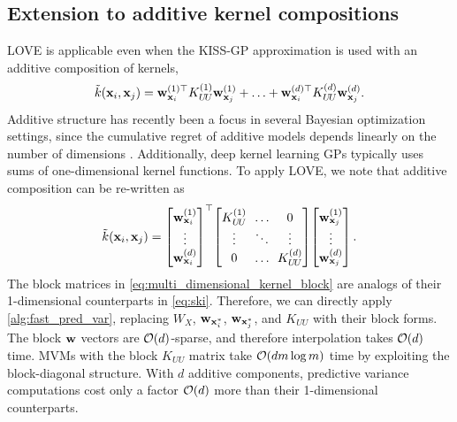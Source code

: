 \subsection{Extension to additive kernel compositions}
LOVE{} is applicable even when the KISS-GP approximation is used with an additive composition of kernels,
%
\begin{equation}
  \tilde{k}(\mathbf{x}_i, \mathbf{x}_j) =
  \mathbf{w}^{(1)\top}_{\mathbf{x}_i} K^{(1)}_{U \! U} \mathbf{w}^{(1)}_{\mathbf{x}_j} + \ldots + \mathbf{w}^{(d)\top}_{\mathbf{x}_i} K^{(d)}_{U \! U} \mathbf{w}^{(d)}_{\mathbf{x}_j}.
  \notag
\end{equation}
Additive structure has recently been a focus in several Bayesian optimization settings, since the cumulative regret of additive models depends linearly on the number of dimensions
\cite{kandasamy2015high,wang2017batched,gardner2017discovering,wang2017max}.
Additionally, deep kernel learning GPs \citep{wilson2016stochastic,wilson2016deep} typically uses sums of one-dimensional kernel functions.
To apply LOVE{}, we note that additive composition can be re-written as
%
\begin{equation}
  \tilde{k}(\bx_i, \bx_j) =
  \begin{bmatrix}
    \bw^{(1)}_{\bx_i} \\
    \vdots \\
    \bw^{(d)}_{\bx_i}
  \end{bmatrix}^\top
  \!
  \begin{bmatrix}
    K^{(1)}_{U \! U} & \!\! \ldots \!\! & 0 \\
    \vdots & \!\! \ddots \!\! & \vdots \\
    0 & \!\! \ldots \!\! & K^{(d)}_{U \! U}
  \end{bmatrix}
  \!
  \begin{bmatrix}
    \bw^{(1)}_{\bx_j} \\
    \vdots \\
    \bw^{(d)}_{\bx_j}
  \end{bmatrix}.
  \label{eq:multi_dimensional_kernel_block}
\end{equation}
%
The block matrices in \eqref{eq:multi_dimensional_kernel_block} are analogs of their 1-dimensional counterparts in \eqref{eq:ski}.
Therefore, we can directly apply \autoref{alg:fast_pred_var}, replacing $W_X$, $\mathbf{w}_{\mathbf{x}^*_i}$, $\mathbf{w}_{\mathbf{x}^*_j}$, and $K_{UU}$ with their block forms.
The block $\mathbf{w}$ vectors are $\bigo{d}$-sparse, and therefore interpolation takes $\bigo{d}$ time.
MVMs with the block $K_{UU}$ matrix take $\bigo{dm\log m}$ time by exploiting the block-diagonal structure. With $d$ additive components, predictive variance computations cost only a factor $\bigo{d}$ more than their 1-dimensional counterparts.
